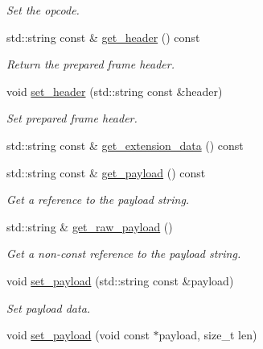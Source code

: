 \begin{DoxyCompactItemize}
\begin{DoxyCompactList}\small\item\em Set the opcode. \end{DoxyCompactList}\item 
std\+::string const \& \hyperlink{classwebsocketpp_1_1message__buffer_1_1message_afa5d0dc833c10a413f693c677c5e3cc6}{get\+\_\+header} () const 
\begin{DoxyCompactList}\small\item\em Return the prepared frame header. \end{DoxyCompactList}\item 
void \hyperlink{classwebsocketpp_1_1message__buffer_1_1message_a230b36c0cd2572cfce1f218a15bc534e}{set\+\_\+header} (std\+::string const \&header)
\begin{DoxyCompactList}\small\item\em Set prepared frame header. \end{DoxyCompactList}\item 
std\+::string const \& \hyperlink{classwebsocketpp_1_1message__buffer_1_1message_a617d03068ebe91aa724270cab41f897c}{get\+\_\+extension\+\_\+data} () const 
\item 
std\+::string const \& \hyperlink{classwebsocketpp_1_1message__buffer_1_1message_a3eb9bb22b99ac155ccb516d06be785e7}{get\+\_\+payload} () const 
\begin{DoxyCompactList}\small\item\em Get a reference to the payload string. \end{DoxyCompactList}\item 
std\+::string \& \hyperlink{classwebsocketpp_1_1message__buffer_1_1message_a403b47e95d65df5b7514eb4eaa89a6df}{get\+\_\+raw\+\_\+payload} ()
\begin{DoxyCompactList}\small\item\em Get a non-\/const reference to the payload string. \end{DoxyCompactList}\item 
void \hyperlink{classwebsocketpp_1_1message__buffer_1_1message_a349d38ec257bde2f6f657cb31af80ced}{set\+\_\+payload} (std\+::string const \&payload)
\begin{DoxyCompactList}\small\item\em Set payload data. \end{DoxyCompactList}\item 
void \hyperlink{classwebsocketpp_1_1message__buffer_1_1message_a714fd661ca04196d2e5b5834f83512aa}{set\+\_\+payload} (void const $\ast$payload, size\+\_\+t len)

\end{DoxyCompactItemize}
